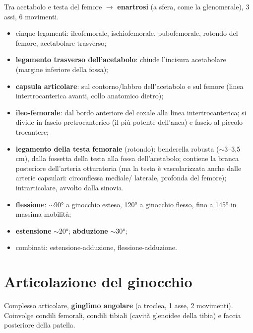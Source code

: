 Tra acetabolo e testa del femore $\rightarrow$ \textbf{enartrosi} (a sfera, come la glenomerale), 3
assi, 6 movimenti.
\begin{itemize}
  \item cinque legamenti: ileofemorale, ischiofemorale, pubofemorale, rotondo del femore, acetabolare
    trasverso;
  \item \textbf{legamento trasverso dell'acetabolo}: chiude l'incisura acetabolare (margine inferiore
    della fossa);
  \item \textbf{capsula articolare}: sul contorno/labbro dell'acetabolo e sul femore (linea
    intertrocanterica avanti, collo anatomico dietro);
  \item \textbf{ileo-femorale}: dal bordo anteriore del coxale alla linea intertrocanterica; si
    divide in fascio pretrocanterico (il più potente dell'anca) e fascio al piccolo trocantere;
  \item \textbf{legamento della testa femorale} (rotondo): benderella robusta ($\sim$3--3,5 cm), dalla
    fossetta della testa alla fossa dell'acetabolo; contiene la branca posteriore dell'arteria
    otturatoria (ma la testa è vascolarizzata anche dalle arterie capsulari: circonflessa mediale/
    laterale, profonda del femore); intrarticolare, avvolto dalla sinovia.
\end{itemize}
\begin{itemize}
  \item \textbf{flessione}: $\sim$90° a ginocchio esteso, 120° a ginocchio flesso, fino a 145° in
    massima mobilità;
  \item \textbf{estensione} $\sim$20°; \textbf{abduzione} $\sim$30°;
  \item combinati: estensione-adduzione, flessione-adduzione.
\end{itemize}

\section{Articolazione del ginocchio}

Complesso articolare, \textbf{ginglimo angolare} (a troclea, 1 asse, 2 movimenti). Coinvolge condili
femorali, condili tibiali (cavità glenoidee della tibia) e faccia posteriore della patella.

